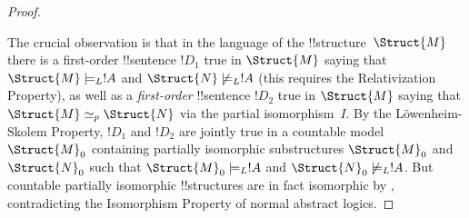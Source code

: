 \documentclass[../../include/open-logic-section]{subfiles}
\begin{document}
\begin{proof}
\begin{figure}[h]
  \centering
\end{figure}

The crucial observation is that in the language of the
!!{structure}~$\Struct{M}$ there is a first-order !!{sentence} $!D_1$
true in $\Struct{M}$ saying that $\Struct{M} \models_L !A$ and
$\Struct{N} \not\models_L !A$ (this requires the Relativization
Property), as well as a \emph{first-order} !!{sentence} $!D_2$ true in
$\Struct{M}$ saying that $\Struct{M} \simeq_p \Struct{N}$ via the
partial isomorphism~$I$. By the L\"owenheim-Skolem Property, $!D_1$
and $!D_2$ are jointly true in a countable model $\Struct{M}_0$
containing partially isomorphic substructures $\Struct{M}_0$ and
$\Struct{N}_0$ such that $\Struct{M}_0 \models_L !A$ and $\Struct{N}_0
\not\models_L !A$. But countable partially isomorphic !!{structure}s are
in fact isomorphic by , contradicting the
Isomorphism Property of normal abstract logics.
\end{proof}
\end{document}
